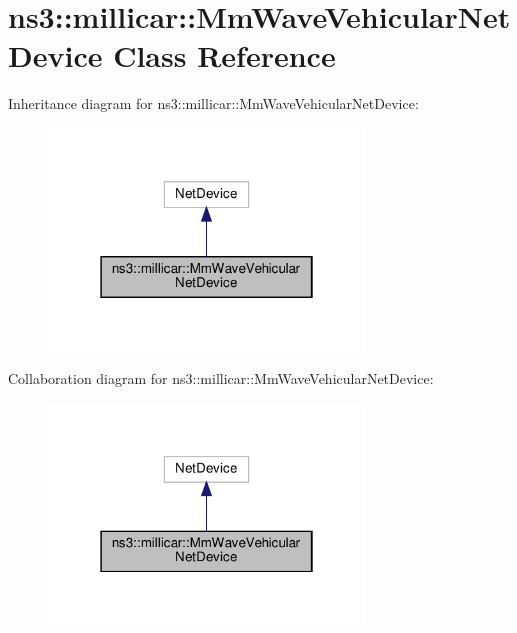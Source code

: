 \hypertarget{classns3_1_1millicar_1_1MmWaveVehicularNetDevice}{}\section{ns3\+:\+:millicar\+:\+:Mm\+Wave\+Vehicular\+Net\+Device Class Reference}
\label{classns3_1_1millicar_1_1MmWaveVehicularNetDevice}


Inheritance diagram for ns3\+:\+:millicar\+:\+:Mm\+Wave\+Vehicular\+Net\+Device\+:\nopagebreak
\begin{figure}[H]
\begin{center}
\leavevmode
\includegraphics[width=238pt]{classns3_1_1millicar_1_1MmWaveVehicularNetDevice__inherit__graph}
\end{center}
\end{figure}


Collaboration diagram for ns3\+:\+:millicar\+:\+:Mm\+Wave\+Vehicular\+Net\+Device\+:\nopagebreak
\begin{figure}[H]
\begin{center}
\leavevmode
\includegraphics[width=238pt]{classns3_1_1millicar_1_1MmWaveVehicularNetDevice__coll__graph}
\end{center}
\end{figure}
